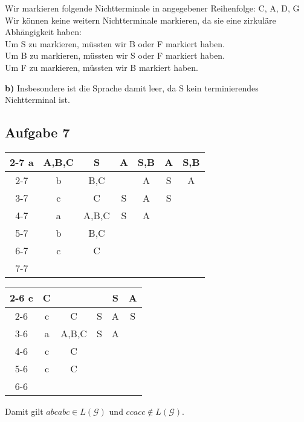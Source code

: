 \documentclass[a4paper,graphics,11pt]{article}
\newcommand{\aufgabe}[1]{\subsection*{Aufgabe #1}}
\begin{document}
Wir markieren folgende Nichtterminale in angegebener Reihenfolge:
C, A, D, G\\
Wir können keine weitern Nichtterminale markieren, da sie eine zirkuläre
Abhängigkeit haben:\\
Um S zu markieren, müssten wir B oder F markiert haben.\\
Um B zu markieren, müssten wir S oder F markiert haben.\\
Um F zu markieren, müssten wir B markiert haben.

\textbf{b)}
Insbesondere ist die Sprache damit leer, da S kein terminierendes Nichtterminal ist.

\aufgabe{7}
\begin{minipage}{0.5\textwidth}
    \begin{tabular}{*{7}{c|}}
        \cline{2-7}
                            a & A,B,C   & S & A & S,B & A & S,B   \\  \cline{2-7}
        \multicolumn{1}{c} {} & b & B,C     &   & A & S & A       \\  \cline{3-7}
        \multicolumn{2}{c} {} & c & C       & S & A & S           \\  \cline{4-7}
        \multicolumn{3}{c} {} & a & A,B,C   & S & A               \\  \cline{5-7}
        \multicolumn{4}{c} {} & b & B,C     &                     \\  \cline{6-7}
        \multicolumn{5}{c} {} & c & C                       \\  \cline{7-7}
    \end{tabular}
\end{minipage}
\begin{minipage}{0.5\textwidth}
    \begin{tabular}{*{6}{c|}}
        \cline{2-6}
                            c & C &   &   & S & A   \\  \cline{2-6}
        \multicolumn{1}{c} {} & c & C & S & A & S       \\  \cline{3-6}
        \multicolumn{2}{c} {} & a & A,B,C & S & A           \\  \cline{4-6}
        \multicolumn{3}{c} {} & c & C &                 \\  \cline{5-6}
        \multicolumn{4}{c} {} & c & C                   \\  \cline{6-6}
    \end{tabular}
\end{minipage}

Damit gilt $abcabc \in L(\mathcal{G})$ und $ccacc \notin L(\mathcal{G})$.
\end{document}

